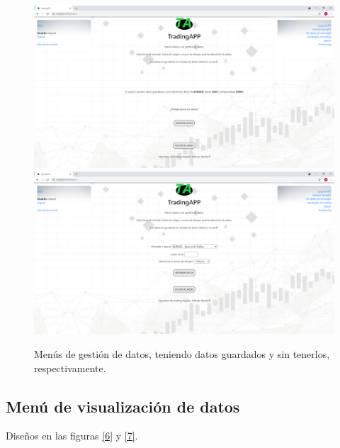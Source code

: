 \begin{figure}[h]
	\includegraphics[width=1.2\textwidth]{imagenes/diseno_final/menu_gestion_datos.png}\newline \\
	\includegraphics[width=1.2\textwidth]{imagenes/diseno_final/menu_gestion_datos_borrados.png}
	
	\caption{Menús de gestión de datos, teniendo datos guardados y sin tenerlos, respectivamente.}  \label{5}
\end{figure}

\subsection{Menú de visualización de datos}
Diseños en las figuras \ref{6} y \ref{7}.

